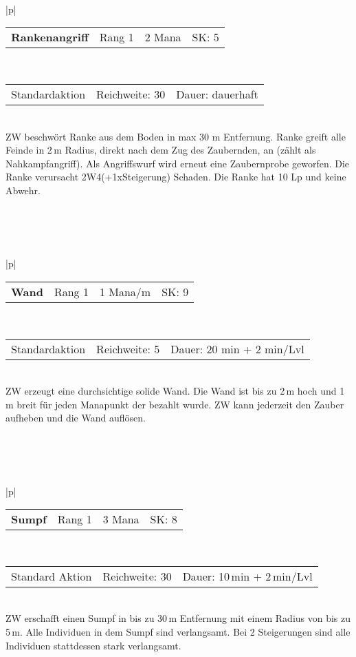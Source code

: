 \documentclass[../../Heldenanleitung2]{subfiles}
\begin{document}
\\\\\\
\begin{tabular}{|p{\textwidth}|}
\hline
\begin{tabularx}{\textwidth}{X|X|X|X}
\textbf{Rankenangriff} & Rang 1 & 2 Mana & SK: 5
\end{tabularx} \\ \hline
\begin{tabularx}{\textwidth}{X|X|X}
Standardaktion & Reichweite: 30 & Dauer: dauerhaft
\end{tabularx} \\ \hline
ZW beschwört Ranke aus dem Boden in max 30 m Entfernung. Ranke greift alle Feinde in 2\,m Radius, direkt nach dem Zug des Zaubernden, an (zählt als Nahkampfangriff). Als Angriffswurf wird erneut eine Zaubernprobe geworfen. Die Ranke verursacht 2W4(+1xSteigerung) Schaden. Die Ranke hat 10 Lp und keine Abwehr.
\\ \hline
\end{tabular}
\\\\\\
\begin{tabular}{|p{\textwidth}|}
\hline
\begin{tabularx}{\textwidth}{X|X|X|X}
\textbf{Wand} & Rang 1 & 1 Mana/m & SK: 9
\end{tabularx} \\ \hline
\begin{tabularx}{\textwidth}{X|X|X}
Standardaktion & Reichweite: 5 & Dauer: 20 min + 2 min/Lvl
\end{tabularx} \\ \hline
ZW erzeugt eine durchsichtige solide Wand. Die Wand ist bis zu 2\,m hoch und 1\,m breit für jeden Manapunkt der bezahlt wurde. ZW kann jederzeit den Zauber aufheben und die Wand auflösen.
\\ \hline
\end{tabular}
\\\\\\
\begin{tabular}{|p{\textwidth}|}
\hline
\begin{tabularx}{\textwidth}{X|X|X|X}
\textbf{Sumpf} & Rang 1 & 3 Mana & SK: 8
\end{tabularx} \\ \hline
\begin{tabularx}{\textwidth}{X|X|X}
Standard Aktion & Reichweite: 30 & Dauer: 10\,min + 2\,min/Lvl
\end{tabularx} \\ \hline
ZW erschafft einen Sumpf in bis zu 30\,m Entfernung mit einem Radius von bis zu 5\,m. Alle Individuen in dem Sumpf sind verlangsamt. Bei 2 Steigerungen sind alle Individuen stattdessen stark verlangsamt.
\\ \hline
\end{tabular}
\end{document}
